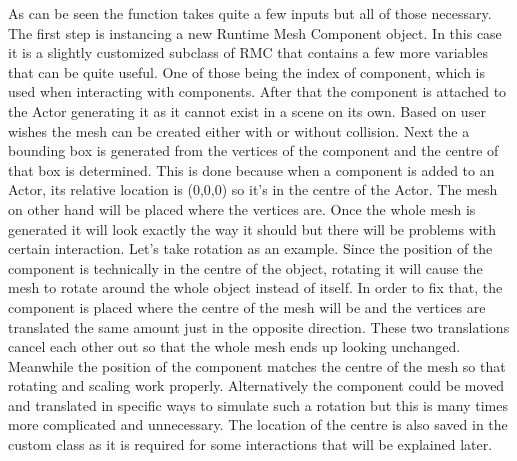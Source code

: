 As can be seen the function takes quite a few inputs but all of those necessary. The first step is instancing a new Runtime Mesh Component object. In this case it is a slightly customized subclass of RMC that contains a few more variables that can be quite useful. One of those being the index of component, which is used when interacting with components. After that the component is attached to the Actor generating it as it cannot exist in a scene on its own. Based on user wishes the mesh can be created either with or without collision. Next the a bounding box is generated from the vertices of the component and the centre of that box is determined. This is done because when a component is added to an Actor, its relative location is (0,0,0) so it's in the centre of the Actor. The mesh on other hand will be placed where the vertices are. Once the whole mesh is generated it will look exactly the way it should but there will be problems with certain interaction. Let's take rotation as an example. Since the position of the component is technically in the centre of the object, rotating it will cause the mesh to rotate around the whole object instead of itself. In order to fix that, the component is placed where the centre of the mesh will be and the vertices are translated the same amount just in the opposite direction. These two translations cancel each other out so that the whole mesh ends up looking unchanged. Meanwhile the position of the component matches the centre of the mesh so that rotating and scaling work properly. Alternatively the component could be moved and translated in specific ways to simulate such a rotation but this is many times more complicated and unnecessary. The location of the centre is also saved in the custom class as it is required for some interactions that will be explained later.\\
